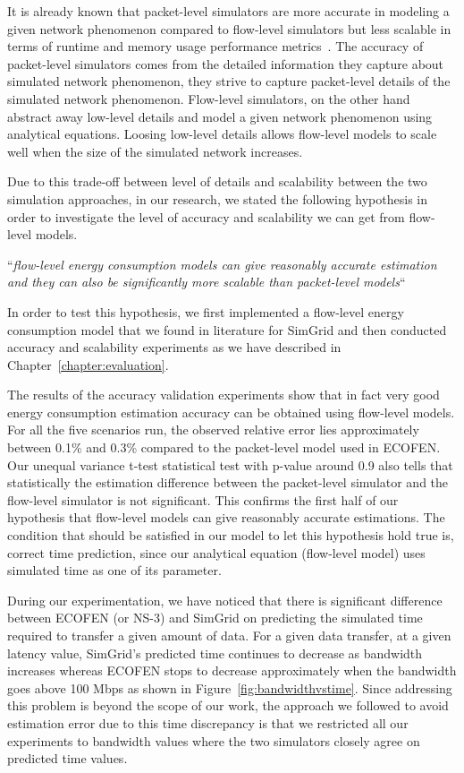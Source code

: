 It is already known that packet-level simulators are more accurate in modeling a given network phenomenon compared to flow-level simulators but less scalable in terms of runtime and memory usage performance metrics~\cite{DBLP:conf/infocom/LiuFGKT01}. The accuracy of packet-level simulators comes from the detailed information they capture about simulated network phenomenon, they strive to capture packet-level details of the simulated network phenomenon. Flow-level simulators, on the other hand abstract away low-level details and model a given network phenomenon using analytical equations. Loosing low-level details allows flow-level models to scale well when the size of the simulated network increases. 

Due to this trade-off between level of details and scalability between the two simulation approaches, in our research, we stated the following hypothesis in order to investigate the level of accuracy and scalability we can get from flow-level models.

``\emph{flow-level energy consumption models can give reasonably accurate estimation and they can also be significantly more scalable than packet-level models}``

In order to test this hypothesis, we first implemented a flow-level energy consumption model that we found in literature for SimGrid and then conducted accuracy and scalability experiments as we have described in Chapter~\ref{chapter:evaluation}. 

The results of the accuracy validation experiments show that in fact very good energy consumption estimation accuracy can be obtained using flow-level models. For all the five scenarios run, the observed relative error lies approximately between  0.1\% and 0.3\% compared to the packet-level model used in ECOFEN. Our unequal variance t-test statistical test with p-value around 0.9 also tells that statistically the estimation difference between the packet-level simulator and the flow-level simulator is not significant. This confirms the first half of our hypothesis that flow-level models can give reasonably accurate estimations. The condition that should be satisfied in our model to let this hypothesis hold true is, correct time prediction, since our analytical equation (flow-level model) uses simulated time as one of its parameter. 

During our experimentation, we have noticed that there is significant difference between ECOFEN (or NS-3) and SimGrid on predicting the simulated time required to transfer a given amount of data. For a given data transfer, at a given latency value, SimGrid's predicted time continues to decrease as bandwidth increases whereas ECOFEN stops to decrease approximately when the bandwidth goes above 100 Mbps as shown in Figure~\ref{fig:bandwidthvstime}. Since addressing this problem is beyond the scope of our work, the approach we followed to avoid estimation error due to this time discrepancy is that we restricted all our experiments to bandwidth values where the two simulators closely agree on predicted time values.

